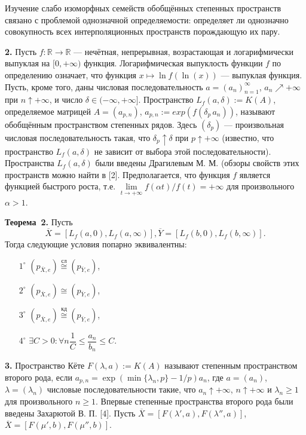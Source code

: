 Изучение слабо изоморфных семейств обобщённых степенных про\-ст\-ранств связано с проблемой однозначной
определяемости: определяет ли однозначно совокупность всех интерполяционных пространств
порождающую их пару.

{\bf 2. }Пусть $f:{\mathbb R}\to{\mathbb R}$ --- нечётная, непрерывная, возрастающая и логарифмически выпуклая
на $[0,+\infty )$ функция. Логарифмическая выпуклость функции $f$  по определению означает, что функция
$x\mapsto \ln f(\ln(x))$ --- выпуклая функция. Пусть, кроме того, даны числовая последовательность
$a=(a_{n})_{n=1}^{\infty }$, $a_n\nearrow +\infty $ при $n\uparrow +\infty $,
и число $\delta \in (-\infty ,+\infty ]$.   Пространство $L_{f}(a,\delta ):=K(A)$,  определяемое
матрицей $A=(a_{p,n})$, $a_{p,n}:= exp (f(\delta_p\, a_n))$,
называют обобщённым пространством степенных рядов.
Здесь $(\delta_p)$ --- произвольная
числовая последовательность такая, что $\delta_p \uparrow \delta  $ при $p\uparrow +\infty $
(известно, что пространство $L_{f}(a,\delta )$ не зависит от выбора этой последовательности). Пространства $L_{f}(a,\delta )$
были введены Драгилевым М. М. (обзоры свойств этих пространств можно найти в [2].
Предполагается, что функция $f$ является функцией быстрого роста, т.е.
$\lim\limits_{t\to +\infty }f(\alpha t)/f(t)=+\infty $ для произвольного $\alpha >1$.

\noindent\textbf{Теорема~2.}
Пусть 
$$
\overline{X}=[L_{f}(a,0),L_{f}(a,\infty )], \overline{Y}=[L_{f}(b,0),L_{f}(b,\infty )].
$$
Тогда следующие условия попарно эквивалентны:
\begin{itemize}
\item[$1^{\circ}$] $(p_{\overline{X},e})\stackrel{\text{сл}}{\cong}(p_{\overline{Y},e})$,
\item[$2^{\circ}$] $(p_{\overline{X},e})\cong(p_{\overline{Y},e})$,
\item[$3^{\circ}$] $(p_{\overline{X},e})\stackrel{\text{кд}}{\cong}(p_{\overline{Y},e})$,
\item[$4^{\circ}$] $\exists{C>0:}\forall{n} \dfrac{1}{C}\leqslant \dfrac{a_{n}}{b_{n}}\leqslant C$.
\end{itemize}

{\bf 3. }Пространство Кёте $F(\lambda ,a):=K(A)$ называют степенным пространством второго рода, если
$a_{p,n}=\exp(\min\{\lambda_n,p \}-1/p)a_{n}$, где $a=(a_n)$, $\lambda=(\lambda_n)$ числовые
последовательности такие, что $a_n\uparrow +\infty $, $n\uparrow +\infty $ и $\lambda_n\geqslant 1$ для
произвольного $n\geqslant 1$. Впервые степенные пространства
второго рода были введены Захарютой В. П. [4].
Пусть $\overline{X}=[F(\lambda',a),F(\lambda'',a)]$, $\overline{X}=[F(\mu',b),F(\mu'',b)]$.

